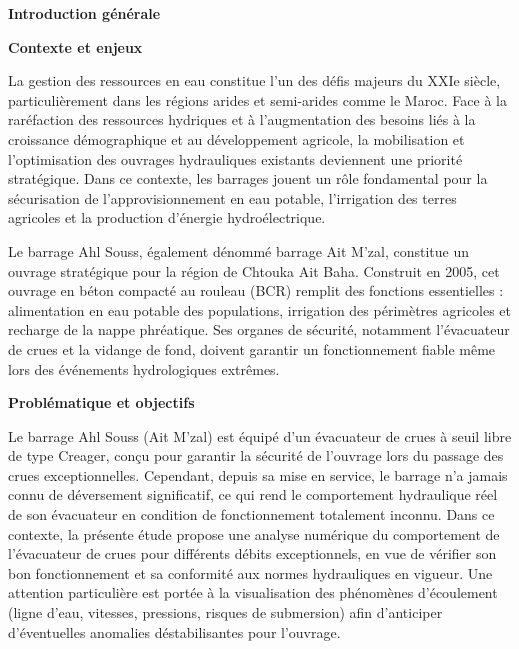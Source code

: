\newpage
{}
\vspace*{1.5cm}

\begin{center}
    \textbf{\Large Introduction générale}
\end{center}
\vspace{1cm}

{
\setlength{\parindent}{0pt}
\setlength{\parskip}{1em}

\textbf{Contexte et enjeux}

La gestion des ressources en eau constitue l'un des défis majeurs du XXIe siècle, particulièrement dans les régions arides et semi-arides comme le Maroc. Face à la raréfaction des ressources hydriques et à l'augmentation des besoins liés à la croissance démographique et au développement agricole, la mobilisation et l'optimisation des ouvrages hydrauliques existants deviennent une priorité stratégique. Dans ce contexte, les barrages jouent un rôle fondamental pour la sécurisation de l'approvisionnement en eau potable, l'irrigation des terres agricoles et la production d'énergie hydroélectrique.

Le barrage Ahl Souss, également dénommé barrage Ait M'zal, constitue un ouvrage stratégique pour la région de Chtouka Ait Baha. Construit en 2005, cet ouvrage en béton compacté au rouleau (BCR) remplit des fonctions essentielles : alimentation en eau potable des populations, irrigation des périmètres agricoles et recharge de la nappe phréatique. Ses organes de sécurité, notamment l'évacuateur de crues et la vidange de fond, doivent garantir un fonctionnement fiable même lors des événements hydrologiques extrêmes.

\textbf{Problématique et objectifs}

Le barrage Ahl Souss (Ait M'zal) est équipé d'un évacuateur de crues à seuil libre de type Creager, conçu pour garantir la sécurité de l'ouvrage lors du passage des crues exceptionnelles. Cependant, depuis sa mise en service, le barrage n'a jamais connu de déversement significatif, ce qui rend le comportement hydraulique réel de son évacuateur en condition de fonctionnement totalement inconnu. Dans ce contexte, la présente étude propose une analyse numérique du comportement de l'évacuateur de crues pour différents débits exceptionnels, en vue de vérifier son bon fonctionnement et sa conformité aux normes hydrauliques en vigueur. Une attention particulière est portée à la visualisation des phénomènes d'écoulement (ligne d'eau, vitesses, pressions, risques de submersion) afin d'anticiper d'éventuelles anomalies déstabilisantes pour l'ouvrage.

}
